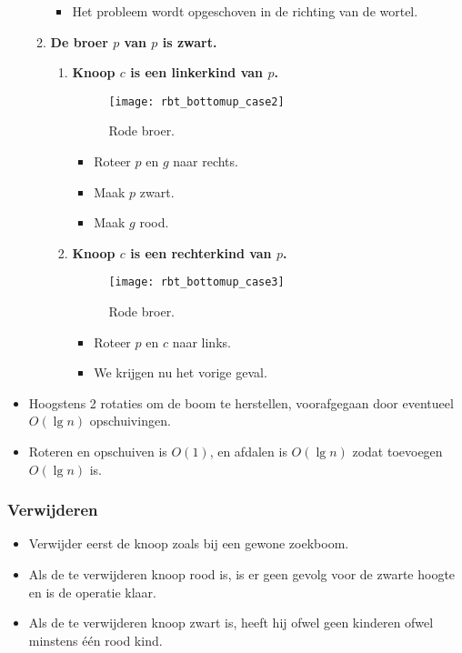 \begin{itemize}
\begin{enumerate}
\begin{itemize}
            \item Het probleem wordt opgeschoven in de richting van de wortel.
        \end{itemize}
        \item \textbf{De broer $p$ van $p$ is zwart.}
        \begin{enumerate}
            \item \textbf{Knoop $c$ is een linkerkind van $p$.}
            \begin{figure}[ht]
                \centering
                \texttt{[image: rbt\_bottomup\_case2]}
                \caption{Rode broer.}
                \label{fig:rbt_bottomup_case1}
            \end{figure}
            \begin{itemize}
                \item Roteer $p$ en $g$ naar rechts. 
                \item Maak $p$ zwart.
                \item Maak $g$ rood.
            \end{itemize}
            \item \textbf{Knoop $c$ is een rechterkind van $p$.}
            \begin{figure}[ht]
                \centering
                \texttt{[image: rbt\_bottomup\_case3]}
                \caption{Rode broer.}
                \label{fig:rbt_bottomup_case1}
            \end{figure}
            \begin{itemize}
                \item Roteer $p$ en $c$ naar links.
                \item We krijgen nu het vorige geval.
            \end{itemize}
        \end{enumerate}
    \end{enumerate}
    \item Hoogstens 2 rotaties om de boom te herstellen, voorafgegaan door eventueel $O(\lg n)$ opschuivingen.
    \item Roteren en opschuiven is $O(1)$, en afdalen is $O(\lg n)$ zodat toevoegen $O(\lg n)$ is.
\end{itemize}



\subsubsection{Verwijderen}
\begin{itemize}
    \item Verwijder eerst de knoop zoals bij een gewone zoekboom.
    \item Als de te verwijderen knoop rood is, is er geen gevolg voor de zwarte hoogte en is de operatie klaar.
    \item Als de te verwijderen knoop zwart is, heeft hij ofwel geen kinderen ofwel minstens één rood kind.
\end{itemize}



